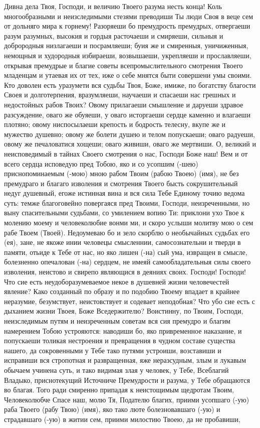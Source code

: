 \mychapterending




Дивна дела Твоя, Господи, и величию Твоего разума несть конца! Коль многообразными и неизследимыми стезями преводиши Ты люди Своя в веце сем от дольняго мира к горнему! Разоряеши бо премудрость премудрых, отвергаеши разум разумных, высокия и гордыя расточаеши и смиряеши, сильныя и доброродныя низлагаеши и посрамляеши; буия же и смиренныя, уничиженныя, немощныя и худородныя избираеши, возвышаеши, укрепляеши и прославляеши, открывая премудрые и благие советы всепромыслительного смотрения Твоего младенцам и утаевая их от тех, иже о себе мнятся быти совершени умы своими. Кто доволен есть уразумети вся судьбы Твоя, Боже, имиже, по богатству благости Своея и долготерпения, вразумляеши, научаеши и спасаеши нас грешных и недостойных рабов Твоих? Овому прилагаеши смышление и даруеши здравое разсуждение, оваго же обуяеши, у оваго исторгаеши сердце каменно и влагаеши плотяно; овому ниспосылаеши крепость и бодрость телесну, вкупе же и мужество душевно; овому же болети душею и телом попускаеши; оваго радуеши, овому же печаловатися хощеши; оваго живиши, оваго же мертвиши. О, великий и неисповедимый в тайнах Своего смотрения о нас, Господи Боже наш! Вем и от всего сердца исповедую пред Тобою, яко и со усопшим (-шею) приснопоминаемым (-мою) мною рабом Твоим (рабою Твоею) (имя), не без премудраго и благаго изволения и смотрения Твоего бысть сокрушительный недуг душевный, егоже истинная вина и вся сила Тебе Единому точию ведома суть: темже благоговейно повергаяся пред Твоими, Господи, неизреченными, но выну спасительными судьбами, со умилением вопию Ти: приклони ухо Твое к молению моему и человеколюбие вонми ми, и скоро услыши молитву мою о сем рабе Твоем (Твоей). Недоумеваю бо и зело скорблю о необычайных судьбах его (ея), зане, не якоже инии человецы смысленнии, самосознательни и тверди в памяти, отьиде к Тебе от нас, но яко лишен (-на) сый ума, извращен в смысле, болезненно опечалован (-на) сердцем, не имеяй самообладательныя силы своего изволения, неистово и свирепо являющися в деяниях своих. Господи! Господи! Что сие есть неудоборазумеваемое некое в душевней жизни человечестей явление? Како созданный по образу и по подобию Твоему впадает в крайнее неразумие, безумствует, неистовствует и содевает неподобная? Что убо сие есть с дыханием жизни Твоея, Боже Вседержителю? Воистинну, по Твоим, Господи, неизследимым путям и неизреченным советам вся сия премудро и благим намерением Тобою устрояются: наводиши бо, яко привременное наказание, и попускаеши толикая нестроения и превращения в чудном составе существа нашего, да сокровенными у Тебе тако путями устроиши, возставиши и исправиши вся стропотная и развращенная, яже неразсудным, злым и лукавым обычаем учинена суть, и тако видимая злая у человек, у Тебе, Всеблагий Владыко, приснотекущий Источниче Премудрости и разума, у Тебе обращаются во благая. Того ради смиренно припадая к неистощимым щедротам Твоим, Человеколюбче Спасе наш, молю Тя, Подателю благих, приими усопшаго (-ую) раба Твоего (рабу Твою) (имя), яко тако люте болезновавшаго (-ую) и страдавшаго (-ую) в житии сем, приими милостию Твоею, да не пробавиши, 